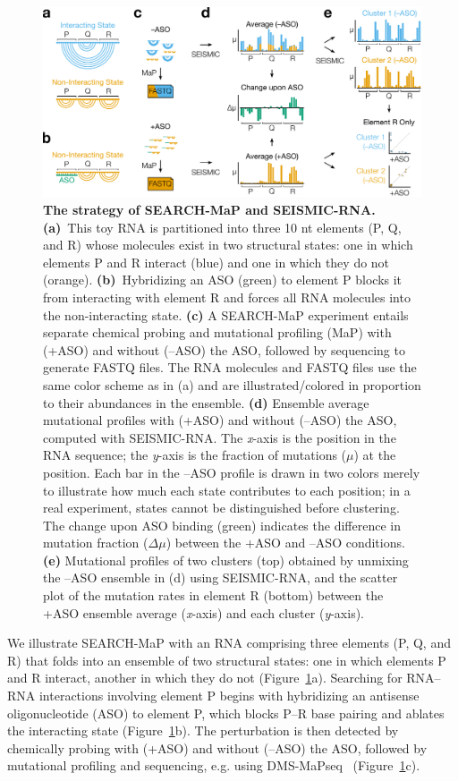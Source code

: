 \documentclass[main.tex]{subfiles}
\begin{document}
\begin{figure}[H]
	\includegraphics[width=\textwidth]{../MainFigures/strat.pdf}
	\caption{\textbf{The strategy of SEARCH-MaP and SEISMIC-RNA.} \textbf{(a)}~This toy RNA is partitioned into three 10 nt elements (P, Q, and R) whose molecules exist in two structural states: one in which elements P and R interact (blue) and one in which they do not (orange). \textbf{(b)}~Hybridizing an ASO (green) to element P blocks it from interacting with element R and forces all RNA molecules into the non-interacting state. \textbf{(c)} A SEARCH-MaP experiment entails separate chemical probing and mutational profiling (MaP) with (+ASO) and without (--ASO) the ASO, followed by sequencing to generate FASTQ files. The RNA molecules and FASTQ files use the same color scheme as in (a) and are illustrated/colored in proportion to their abundances in the ensemble. \textbf{(d)} Ensemble average mutational profiles with (+ASO) and without (--ASO) the ASO, computed with SEISMIC-RNA. The \textit{x}-axis is the position in the RNA sequence; the \textit{y}-axis is the fraction of mutations ($\mu$) at the position. Each bar in the --ASO profile is drawn in two colors merely to illustrate how much each state contributes to each position; in a real experiment, states cannot be distinguished before clustering. The change upon ASO binding (green) indicates the difference in mutation fraction ($\Delta \mu$) between the +ASO and --ASO conditions. \textbf{(e)} Mutational profiles of two clusters (top) obtained by unmixing the --ASO ensemble in (d) using SEISMIC-RNA, and the scatter plot of the mutation rates in element R (bottom) between the +ASO ensemble average (\textit{x}-axis) and each cluster (\textit{y}-axis).}
	\label{strat}
\end{figure}


We illustrate SEARCH-MaP with an RNA comprising three elements (P, Q, and R) that folds into an ensemble of two structural states: one in which elements P and R interact, another in which they do not (Figure~\ref{strat}a).
Searching for RNA--RNA interactions involving element P begins with hybridizing an antisense oligonucleotide (ASO) to element P, which blocks P--R base pairing and ablates the interacting state (Figure~\ref{strat}b).
The perturbation is then detected by chemically probing with (+ASO) and without (--ASO) the ASO, followed by mutational profiling and sequencing, e.g. using DMS-MaPseq~\cite{Zubradt2016} (Figure~\ref{strat}c).
\end{document}
